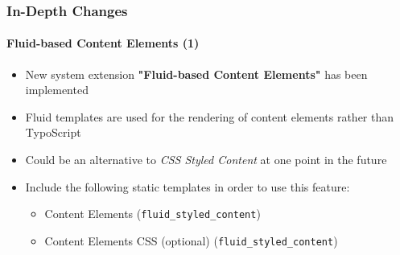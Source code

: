 \begin{frame}[fragile]
	\frametitle{In-Depth Changes}
	\framesubtitle{Fluid-based Content Elements (1)}

	\begin{itemize}

		\item New system extension \textbf{"Fluid-based Content Elements"} has been implemented

		\item Fluid templates are used for the rendering of content elements rather than TypoScript

		\item Could be an alternative to \textit{CSS Styled Content} at one point in the future

		\item Include the following static templates in order to use this feature:

			\begin{itemize}
				\item Content Elements (\texttt{fluid\_styled\_content})
				\item Content Elements CSS (optional) (\texttt{fluid\_styled\_content})
			\end{itemize}

	\end{itemize}

\end{frame}




